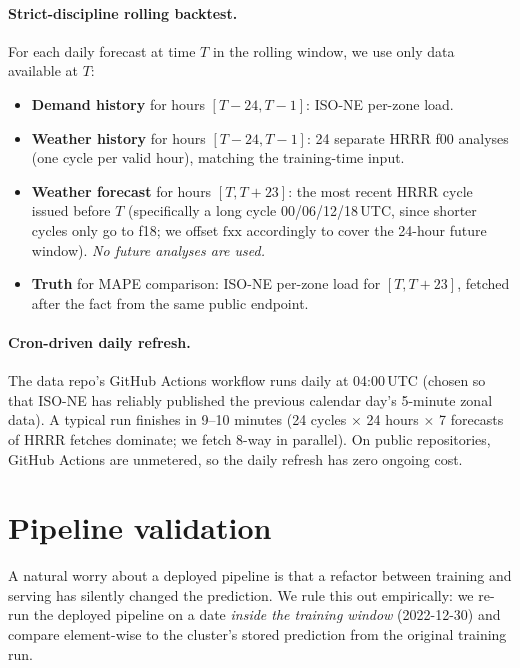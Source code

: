 \paragraph{Strict-discipline rolling backtest.}
For each daily forecast at time $T$ in the rolling window, we use only data available at $T$:

\begin{itemize}\setlength\itemsep{1pt}
  \item \textbf{Demand history} for hours $[T-24, T-1]$: ISO-NE per-zone load.
  \item \textbf{Weather history} for hours $[T-24, T-1]$: 24 separate HRRR f00 analyses (one cycle per valid hour), matching the training-time input.
  \item \textbf{Weather forecast} for hours $[T, T+23]$: the most recent HRRR cycle issued before $T$ (specifically a long cycle 00/06/12/18\,UTC, since shorter cycles only go to f18; we offset $\mathrm{fxx}$ accordingly to cover the 24-hour future window). \emph{No future analyses are used.}
  \item \textbf{Truth} for MAPE comparison: ISO-NE per-zone load for $[T, T+23]$, fetched after the fact from the same public endpoint.
\end{itemize}

\paragraph{Cron-driven daily refresh.}
The data repo's GitHub Actions workflow runs daily at 04:00\,UTC (chosen so that ISO-NE has reliably published the previous calendar day's 5-minute zonal data). A typical run finishes in 9--10 minutes (24 cycles $\times$ 24 hours $\times$ 7 forecasts of HRRR fetches dominate; we fetch 8-way in parallel). On public repositories, GitHub Actions are unmetered, so the daily refresh has zero ongoing cost.

\section{Pipeline validation}
\label{sec:deploy:validation}

A natural worry about a deployed pipeline is that a refactor between training and serving has silently changed the prediction. We rule this out empirically: we re-run the deployed pipeline on a date \emph{inside the training window} (2022-12-30) and compare element-wise to the cluster's stored prediction from the original training run.


